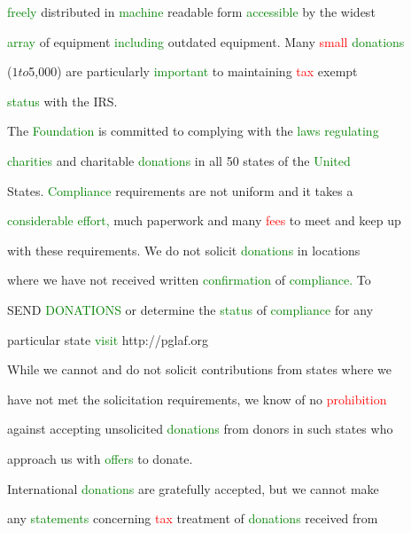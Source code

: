  \textcolor{green}{freely} distributed in \textcolor{green}{machine} readable form \textcolor{green}{accessible} by the widest

 \textcolor{green}{array} of equipment \textcolor{green}{including} outdated equipment. Many \textcolor{red}{small} \textcolor{green}{donations}

 ($1 to $5,000) are particularly \textcolor{green}{important} to maintaining \textcolor{red}{tax} exempt

 \textcolor{green}{status} with the IRS.



 The \textcolor{green}{Foundation} is committed to complying with the \textcolor{green}{laws} \textcolor{green}{regulating}

 \textcolor{green}{charities} and \textcolor{BurntOrange}{charitable} \textcolor{green}{donations} in all 50 states of the \textcolor{green}{United}

 States. \textcolor{green}{Compliance} requirements are not uniform and it takes a

 \textcolor{green}{considerable} \textcolor{green}{effort,} much paperwork and many \textcolor{red}{fees} to meet and keep up

 with these requirements. We do not solicit \textcolor{green}{donations} in locations

 where we have not received written \textcolor{green}{confirmation} of \textcolor{green}{compliance.} To

 SEND \textcolor{green}{DONATIONS} or determine the \textcolor{green}{status} of \textcolor{green}{compliance} for any

 particular state \textcolor{green}{visit} http://pglaf.org



 While we cannot and do not solicit contributions from states where we

 have not met the solicitation requirements, we know of no \textcolor{red}{prohibition}

 against accepting unsolicited \textcolor{green}{donations} from donors in such states who

 approach us with \textcolor{green}{offers} to donate.



 International \textcolor{green}{donations} are gratefully accepted, but we cannot make

 any \textcolor{green}{statements} concerning \textcolor{red}{tax} treatment of \textcolor{green}{donations} received from

